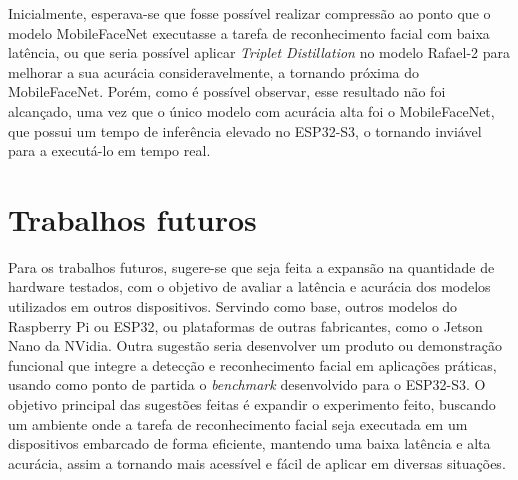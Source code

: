 Inicialmente, esperava-se que fosse possível realizar compressão ao ponto que o modelo MobileFaceNet executasse
a tarefa de reconhecimento facial com baixa latência, ou que seria possível aplicar
\textit{Triplet Distillation} no modelo Rafael-2 para melhorar a sua acurácia consideravelmente, a tornando
próxima do MobileFaceNet.
Porém, como é possível observar, esse resultado não foi alcançado, uma vez que o único modelo com acurácia alta
foi o MobileFaceNet, que possui um tempo de inferência elevado no ESP32-S3, o tornando inviável para a
executá-lo em tempo real.

\section{Trabalhos futuros}
Para os trabalhos futuros, sugere-se que seja feita a expansão na  quantidade de hardware testados, com o objetivo de
avaliar a latência e acurácia dos modelos utilizados em outros dispositivos. Servindo como base, outros modelos do
Raspberry Pi ou ESP32, ou plataformas de outras fabricantes, como o Jetson Nano da NVidia.
Outra sugestão seria desenvolver um produto ou demonstração funcional que integre a detecção e reconhecimento facial em
aplicações práticas, usando como ponto de partida o \textit{benchmark} desenvolvido para o ESP32-S3.
O objetivo principal das sugestões feitas é expandir o experimento feito, buscando um ambiente onde a tarefa de
reconhecimento facial seja executada em um dispositivos embarcado de forma eficiente, mantendo uma baixa latência e
alta acurácia, assim a tornando mais acessível e fácil de aplicar em diversas situações.

